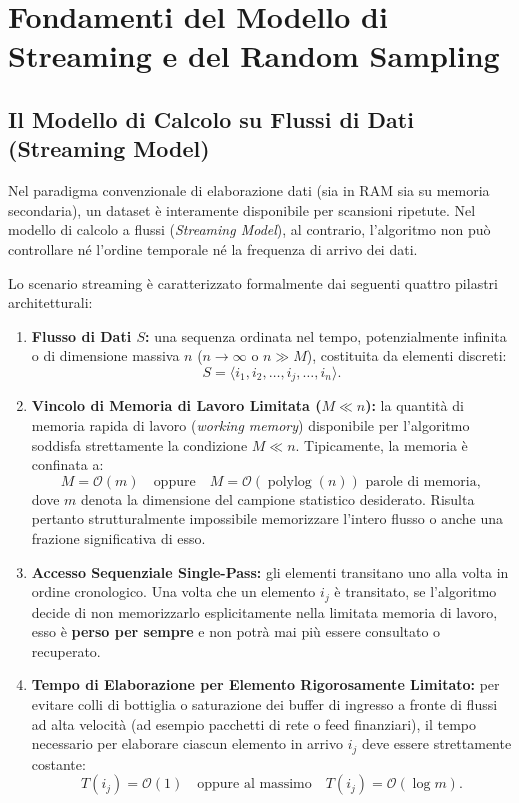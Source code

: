 \FloatBarrier
\section{Fondamenti del Modello di Streaming e del Random Sampling}
\label{sec:streaming-model-foundations}

\subsection{Il Modello di Calcolo su Flussi di Dati (Streaming Model)}
Nel paradigma convenzionale di elaborazione dati (sia in RAM sia su memoria secondaria), un dataset è interamente disponibile per scansioni ripetute. Nel modello di calcolo a flussi (\textit{Streaming Model}), al contrario, l'algoritmo non può controllare né l'ordine temporale né la frequenza di arrivo dei dati.

Lo scenario streaming è caratterizzato formalmente dai seguenti quattro pilastri architetturali:
\begin{enumerate}
  \item \textbf{Flusso di Dati $S$:} una sequenza ordinata nel tempo, potenzialmente infinita o di dimensione massiva $n$ ($n \to \infty$ o $n \gg M$), costituita da elementi discreti:
  \begin{equation}
    S = \langle i_1, i_2, \dots, i_j, \dots, i_n \rangle.
  \end{equation}
  \item \textbf{Vincolo di Memoria di Lavoro Limitata ($M \ll n$):} la quantità di memoria rapida di lavoro (\textit{working memory}) disponibile per l'algoritmo soddisfa strettamente la condizione $M \ll n$. Tipicamente, la memoria è confinata a:
  \begin{equation}
    M = \mathcal{O}(m) \quad \text{oppure} \quad M = \mathcal{O}(\operatorname{polylog}(n)) \text{ parole di memoria},
  \end{equation}
  dove $m$ denota la dimensione del campione statistico desiderato. Risulta pertanto strutturalmente impossibile memorizzare l'intero flusso o anche una frazione significativa di esso.
  \item \textbf{Accesso Sequenziale Single-Pass:} gli elementi transitano uno alla volta in ordine cronologico. Una volta che un elemento $i_j$ è transitato, se l'algoritmo decide di non memorizzarlo esplicitamente nella limitata memoria di lavoro, esso è \textbf{perso per sempre} e non potrà mai più essere consultato o recuperato.
  \item \textbf{Tempo di Elaborazione per Elemento Rigorosamente Limitato:} per evitare colli di bottiglia o saturazione dei buffer di ingresso a fronte di flussi ad alta velocità (ad esempio pacchetti di rete o feed finanziari), il tempo necessario per elaborare ciascun elemento in arrivo $i_j$ deve essere strettamente costante:
  \begin{equation}
    T(i_j) = \mathcal{O}(1) \quad \text{oppure al massimo} \quad T(i_j) = \mathcal{O}(\log m).
  \end{equation}
\end{enumerate}


